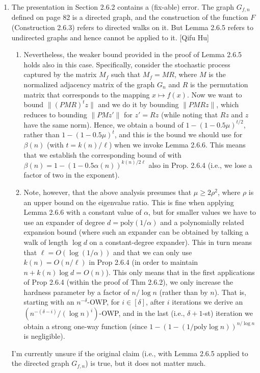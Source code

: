 \documentclass[10pt,a4paper]{article}
\newcommand{\poly}{\mathrm{poly}}
\begin{document}
\begin{enumerate}
	\item The presentation in Section 2.6.2 contains a (fix-able) error. The graph $G_{f,n}$ defined on page 82 is a directed graph, and the construction of the function $F$ (Construction 2.6.3) refers to directed walks on it. But Lemma 2.6.5 refers to undirected graphs and hence cannot be applied to it. [Qifu Hu]
	\begin{enumerate}
		\item Nevertheless, the weaker bound provided in the proof of Lemma 2.6.5 holds also in this case. Specifically, consider the stochastic process captured by the matrix $M_f$ such that $M_f =MR$, where $M$ is the normalized adjacency matrix of the graph $G_n$ and $R$ is the permutation matrix that corresponds to the mapping $x\mapsto f(x)$. Now we want to bound $\|(PMR)^t z\|$ and we do it by bounding $\|PMR z\|$, which reduces to bounding $\|PMz'\|$ for $z'=Rz$ (while noting that $Rz$ and $z$ have the same norm). Hence, we obtain a bound of $1-(1-0.5\mu)^{t/2}$, rather than $1-(1-0.5\mu)^{t}$, and this is the bound we should use for $\beta(n)$ (with $t=k(n)/\ell$) when we invoke Lemma 2.6.6. This means that we establish the corresponding bound of with $\beta(n)=1-(1-0.5\alpha(n))^{k(n)/2\ell}$ also in Prop. 2.6.4 (i.e., we lose a factor of two in the exponent).
		\item Note, however, that the above analysis presumes that $\mu \geq 2\rho^2$, where $\rho$ is an upper bound on the eigenvalue ratio. This is fine when applying Lemma 2.6.6 with a constant value of $\alpha$, but for smaller values we have to use an expander of degree $d=\poly(1/\alpha)$ and a polynomially related expansion bound (where such an expander can be obtained by talking a walk of length $\log d$ on a constant-degree expander). This in turn means that $\ell=O(\log(1/\alpha))$ and that we can only use $k(n)=O(n/\ell)$ in Prop 2.6.4 (in order to maintain $n+k(n)\log d = O(n)$). This only means that in the first applications of Prop 2.6.4 (within the proof of Thm 2.6.2), we only increase the hardness parameter by a factor of $n/\log n$ (rather than by $n$). That is, starting with an $n^{-\delta}$-OWP, for $i\in[\delta]$, after $i$ iterations we derive an $(n^{-(\delta-i)}/(\log n)^i)$-OWP, and in the last (i.e., $\delta+1$-st) iteration we obtain a strong one-way function (since $1-(1-(1/\poly\log n))^{n/\log n}$ is negligible).
	\end{enumerate}
	I'm currently unsure if the original claim (i.e., with Lemma 2.6.5 applied to the directed graph $G_{f,n}$) is true, but it does not matter much.

\end{enumerate}
\end{document}
